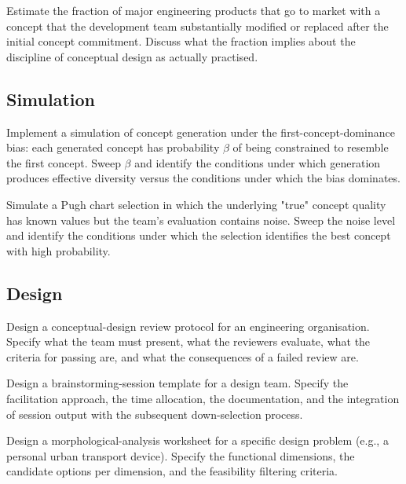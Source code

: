 \begin{exercise}
Estimate the fraction of major engineering products that go to market with a concept that the development team substantially modified or replaced after the initial concept commitment. Discuss what the fraction implies about the discipline of conceptual design as actually practised.
\end{exercise}

\subsection*{Simulation}

\begin{exercise}
Implement a simulation of concept generation under the first-concept-dominance bias: each generated concept has probability $\beta$ of being constrained to resemble the first concept. Sweep $\beta$ and identify the conditions under which generation produces effective diversity versus the conditions under which the bias dominates.
\end{exercise}

\begin{exercise}
Simulate a Pugh chart selection in which the underlying "true" concept quality has known values but the team's evaluation contains noise. Sweep the noise level and identify the conditions under which the selection identifies the best concept with high probability.
\end{exercise}

\subsection*{Design}

\begin{exercise}
Design a conceptual-design review protocol for an engineering organisation. Specify what the team must present, what the reviewers evaluate, what the criteria for passing are, and what the consequences of a failed review are.
\end{exercise}

\begin{exercise}
Design a brainstorming-session template for a design team. Specify the facilitation approach, the time allocation, the documentation, and the integration of session output with the subsequent down-selection process.
\end{exercise}

\begin{exercise}
Design a morphological-analysis worksheet for a specific design problem (e.g., a personal urban transport device). Specify the functional dimensions, the candidate options per dimension, and the feasibility filtering criteria.
\end{exercise}

